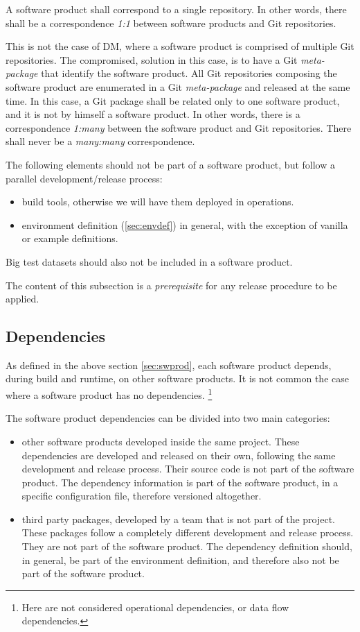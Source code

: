 A software product shall correspond to a single repository.
In other words, there shall be a correspondence \textit{1:1} between software products and Git repositories.

This is not the case of DM, where a software product is comprised of multiple Git repositories.
The compromised, solution in this case, is to have a Git \textit{meta-package} that identify the software product.
All Git repositories composing the software product are enumerated in a Git \textit{meta-package} and released at the same time.
In this case, a Git package shall be related only to one software product, and it is not by himself a software product.
In other words, there is a correspondence \textit{1:many} between the software product and Git repositories.
There shall never be a \textit{many:many} correspondence.

The following elements should not be part of a software product, but follow a parallel development/release process:

\begin{itemize}
\item build tools, otherwise we will have them deployed in operations.
\item environment definition (\ref{sec:envdef}) in general, with the exception of vanilla or example definitions.
\end{itemize}

Big test datasets should also not be included in a software product. 

The content of this subsection is a \textit{prerequisite} for any release procedure to be applied.


\subsection{Dependencies} \label{sec:dependencies}

As defined in the above section \ref{sec:swprod}, each software product depends, during build and runtime, on other software products.
It is not common the case where a software product has no dependencies.
\footnote{Here are not considered operational dependencies, or data flow dependencies.}

The software product dependencies can be divided into two main categories:

\begin{itemize}
\item other software products developed inside the same project.
These dependencies are developed and released on their own, following the same development and release process.
Their source code is not part of the software product.
The dependency information is part of the software product, in a specific configuration file, therefore versioned altogether.
\item third party packages, developed by a team that is not part of the project.
These packages follow a completely different development and release process.
They are not part of the software product.
The dependency definition should, in general, be part of the environment definition, and therefore also not be part of the software product.
\end{itemize}

